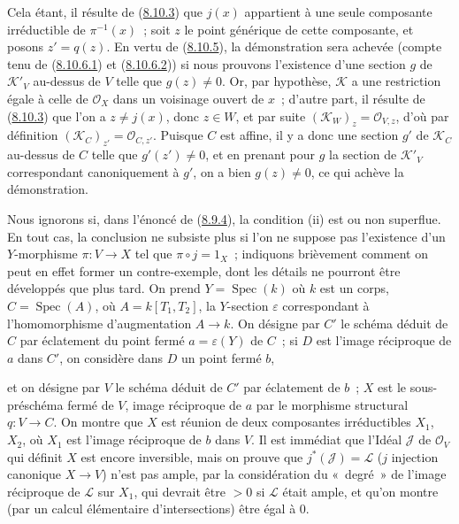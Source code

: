 \begin{env}[8.10.6]
Cela étant, il résulte de (\hyperref[II.8.10.3-fr]{8.10.3}) que $j(x)$
appartient à une seule composante irréductible de $\pi^{-1}(x)$~; soit $z$ le
point générique de cette composante, et posons $z'=q(z)$. En vertu de
(\hyperref[II.8.10.5-fr]{8.10.5}), la démonstration sera achevée (compte tenu
de (\hyperref[II.8.10.6.1-fr]{8.10.6.1}) et
(\hyperref[II.8.10.6.2-fr]{8.10.6.2})) si nous prouvons l'existence d'une
section $g$ de $\mathcal{K}'_V$ au-dessus de $V$ telle que $g(z)\neq0$. Or,
par hypothèse, $\mathcal{K}$ a une restriction égale à celle de
$\mathcal{O}_X$ dans un voisinage ouvert de $x$~; d'autre part, il résulte de
(\hyperref[II.8.10.3-fr]{8.10.3}) que l'on a $z\neq j(x)$, donc $z\in W$, et
par suite $(\mathcal{K}_W)_z=\mathcal{O}_{V,z}$, d'où par définition
$(\mathcal{K}_C)_{z'}=\mathcal{O}_{C,z'}$. Puisque $C$ est affine, il y a donc
une section $g'$ de $\mathcal{K}_C$ au-dessus de $C$ telle que
$g'(z')\neq0$, et en prenant pour $g$ la section de $\mathcal{K}'_V$
correspondant canoniquement à $g'$, on a bien $g(z)\neq0$, ce qui achève la
démonstration.
\end{env}

\begin{remark}[8.10.7]
\label{II.8.10.7-fr}
Nous ignorons si, dans l'énoncé de (\hyperref[II.8.9.4-fr]{8.9.4}), la
condition (ii) est ou non superflue. En tout cas, la conclusion ne subsiste
plus si l'on ne suppose pas l'existence d'un $Y$-morphisme $\pi:V\to X$ tel
que $\pi\circ j=1_X$~; indiquons brièvement comment on peut en effet former un
contre-exemple, dont les détails ne pourront être développés que plus tard.
On prend $Y=\operatorname{Spec}(k)$ où $k$ est un corps,
$C=\operatorname{Spec}(A)$, où $A=k[T_1,T_2]$, la $Y$-section $\varepsilon$
correspondant à l'homomorphisme d'augmentation $A\to k$. On désigne par $C'$
le schéma déduit de $C$ par éclatement du point fermé $a=\varepsilon(Y)$ de
$C$~; si $D$ est l'image réciproque de $a$ dans $C'$, on considère dans $D$
un point fermé $b$,

et on désigne par $V$ le schéma déduit de $C'$ par éclatement de $b$~; $X$ est
le sous-préschéma fermé de $V$, image réciproque de $a$ par le morphisme
structural $q:V\to C$. On montre que $X$ est réunion de deux composantes
irréductibles $X_1$, $X_2$, où $X_1$ est l'image réciproque de $b$ dans $V$.
Il est immédiat que l'Idéal $\mathcal{J}$ de $\mathcal{O}_V$ qui définit $X$
est encore inversible, mais on prouve que
$j^*(\mathcal{J})=\mathcal{L}$ ($j$ injection canonique $X\to V$) n'est pas
ample, par la considération du «~degré~» de l'image réciproque de
$\mathcal{L}$ sur $X_1$, qui devrait être $>0$ si $\mathcal{L}$ était ample,
et qu'on montre (par un calcul élémentaire d'intersections) être égal à 0.
\end{remark}

